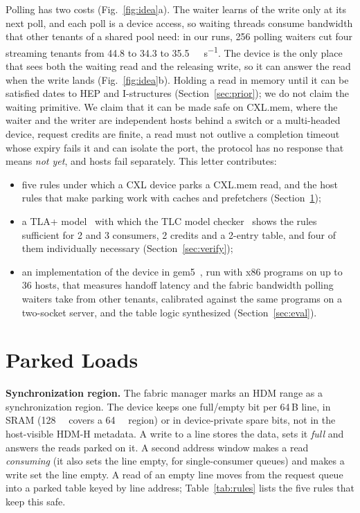 \documentclass[journal]{IEEEtran}
\begin{document}
Polling has two costs (Fig.~\ref{fig:idea}a). The waiter learns of the write only at its next poll,
and each poll is a device access, so waiting threads consume bandwidth that other tenants of a
shared pool need: in our runs, 256 polling waiters cut four streaming tenants from 44.8 to 34.3 to
\SI{35.5}{\giga\byte\per\second}. The device is the only place that sees both the waiting read and the releasing
write, so it can answer the read when the write lands (Fig.~\ref{fig:idea}b). Holding a read in
memory until it can be satisfied dates to HEP and I-structures (Section~\ref{sec:prior}); we do not claim the waiting
primitive. We claim that it can be made safe on CXL.mem, where the waiter and the writer are
independent hosts behind a switch or a multi-headed device, request credits are finite, a read must
not outlive a completion timeout whose expiry fails it and can isolate the port, the protocol has
no response that means \emph{not yet}, and hosts fail separately. This letter contributes:
\begin{itemize}
\item five rules under which a CXL device parks a CXL.mem read, and the host rules that make
parking work with caches and prefetchers (Section~\ref{sec:design});
\item a TLA+ model~\cite{tla} with which the TLC model checker~\cite{tlc} shows the rules sufficient
for 2 and 3 consumers, 2 credits and a 2-entry table, and four of them individually necessary (Section~\ref{sec:verify});
\item an implementation of the device in gem5~\cite{gem5}, run with x86 programs on up to 36 hosts,
that measures handoff latency and the fabric bandwidth polling waiters take from other tenants,
calibrated against the same programs on a two-socket server, and the table logic synthesized
(Section~\ref{sec:eval}).
\end{itemize}

\section{Parked Loads}
\label{sec:design}
\textbf{Synchronization region.} The fabric manager marks an HDM range as a synchronization region.
The device keeps one full/empty bit per 64\,B line, in SRAM (\SI{128}{\kibi\byte}
covers a \SI{64}{\mebi\byte} region) or in device-private spare bits, not in the host-visible HDM-H metadata.
A write to a line stores the data, sets it \emph{full} and answers the reads parked on it. A second
address window makes a read \emph{consuming} (it also sets the line empty, for single-consumer
queues) and makes a write set the line empty. A read of an empty line moves from the request queue into a
parked table keyed by line address; Table~\ref{tab:rules} lists the five rules that keep this safe.
\end{document}
